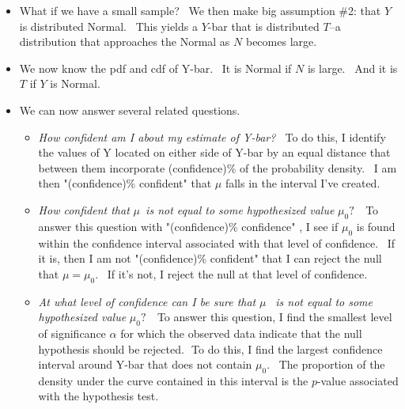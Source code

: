 \documentclass[11pt]{article}
\begin{document}
\begin{itemize}
\item What if we have a small sample? \ We then make big assumption \#2:
that $Y$ is distributed Normal. \ This yields a $Y$-bar that is distributed $%
T$--a distribution that approaches the Normal as $N$ becomes large.

\item We now know the pdf and cdf of Y-bar. \ It is Normal if $N$ is large.
\ And it is $T$ if $Y$ is Normal.

\item We can now answer several related questions. \ 

\begin{itemize}
\item \textit{How confident am I about my estimate of Y-bar? \ }To do this,
I identify the values of Y located on either side of Y-bar by an equal
distance that between them incorporate (confidence)\% of the probability
density. \ I am then "(confidence)\% confident" that $\mu $ falls in the
interval I've created.

\item \textit{How confident that }$\mu $\textit{\ is not equal to some
hypothesized value }$\mu _{0}?$\textit{\ \ }To answer this question with
"(confidence)\% confidence" , I see if $\mu _{0}$ is found within the
confidence interval associated with that level of confidence. \ If it is,
then I am not "(confidence)\% confident" that I can reject the null that $%
\mu =\mu _{0}.$ \ If it's not, I reject the null at that level of confidence.

\item \textit{At what level of confidence can I be sure that }$\mu $\textit{%
\ is not equal to some hypothesized value }$\mu _{0}?$\textit{\ \ }To answer
this question, I find the smallest level of significance $\alpha $ for which
the observed data indicate that the null hypothesis should be rejected.$\ \
\ $To do this, I find the largest confidence interval around Y-bar that does
not contain $\mu _{0}.$ \ The proportion of the density under the curve
contained in this interval is the $p$-value associated with the hypothesis
test.
\end{itemize}
\end{itemize}
\end{document}
